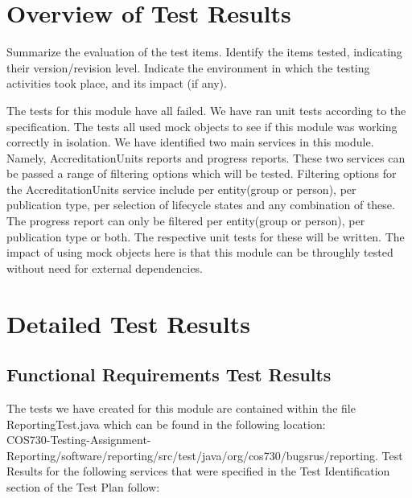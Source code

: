 
\section{Overview of Test Results}
\label{sec:overviewResults}

Summarize the evaluation of the test items. Identify the items tested, indicating their version/revision
level. Indicate the environment in which the testing activities took place, and its impact (if any).

The tests for this module have all failed. We have ran unit tests according to the specification. The tests all used mock objects to see if this module was working correctly in isolation. We have identified two main services in this module. Namely, AccreditationUnits reports and  progress reports. These two services can be passed a range of filtering options which will be tested. Filtering options for the AccreditationUnits service include per entity(group or person), per publication type, per selection of lifecycle states and any combination of these. The progress report can only be filtered per entity(group or person), per publication type or both. The respective unit tests for these will be written. The impact of using mock objects here is that this module can be throughly tested without need for external dependencies. 


\section{Detailed Test Results} 
\label{sec:detailedResults}  
\subsection{Functional Requirements Test Results}
The tests we have created for this module are contained within the file ReportingTest.java which can be found in the following location:
\\  COS730-Testing-Assignment-Reporting/software/reporting/src/test/java/org/cos730/bugsrus/reporting.
Test Results for the following services that were specified in the Test Identification section of the Test Plan follow:  
